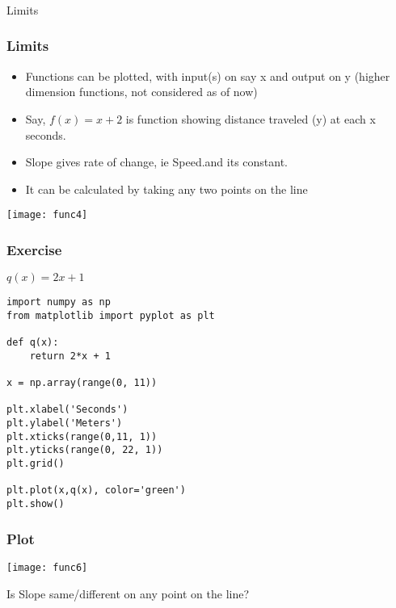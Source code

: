 
\begin{frame}[fragile]\frametitle{}
\begin{center}
{\Large Limits}
\end{center}
\end{frame}

 \begin{frame}[fragile]\frametitle{Limits}
\begin{itemize}
\item Functions can be plotted, with input(s) on say x and output on y (higher dimension functions, not considered as of now)
\item Say, $f(x) = x + 2$ is function showing distance traveled (y) at each x seconds.
\item Slope gives rate of change, ie Speed.and its constant.
\item It can be calculated by taking any two points on the line
\end{itemize}
\begin{center}
\texttt{[image: func4]}
\end{center}
\end{frame}

 \begin{frame}[fragile]\frametitle{Exercise}
$q(x) = 2x+1$

\begin{lstlisting}
import numpy as np
from matplotlib import pyplot as plt

def q(x):
    return 2*x + 1
		
x = np.array(range(0, 11))

plt.xlabel('Seconds')
plt.ylabel('Meters')
plt.xticks(range(0,11, 1))
plt.yticks(range(0, 22, 1))
plt.grid()

plt.plot(x,q(x), color='green')
plt.show()
\end{lstlisting}
\end{frame}


 \begin{frame}[fragile]\frametitle{Plot}
\begin{center}
\texttt{[image: func6]}
\end{center}

Is Slope same/different on any point on the line?

\end{frame}

